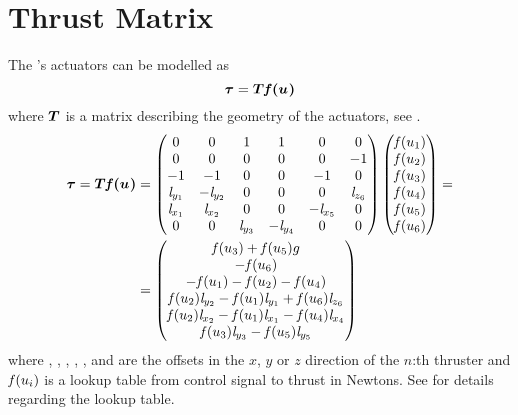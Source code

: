 \section{Thrust Matrix}
The \abbrROV's actuators can be modelled as
\begin{equation}
    \boldsymbol{\tau} = \boldsymbol{T} \boldsymbol{\mathit{f}(u_{})} 
\end{equation}
where $\boldsymbol{T}$ is a matrix describing the geometry of the actuators, see  \citep[p.401]{fossen2011}.
\begin{equation}
\begin{split}
    \boldsymbol{\tau} = \boldsymbol{T} \boldsymbol{\mathit{f}(u_{})} 
    &=
    \begin{pmatrix}
    0& 0& 1& 1& 0& 0\\
    0& 0& 0&  0& 0& -1\\
    -1& -1& 0& 0& -1& 0\\
    \mathit{l}_{y_{1}} & -\mathit{l}_{y_{2}} & 0 &  0 &  0 & \mathit{l}_{z_{6}} \\
    \mathit{l}_{x_{1}} & \mathit{l}_{x_{2}} & 0 & 0 & -\mathit{l}_{x_{5}} & 0 \\
    0 & 0 & \mathit{l}_{y_{3}} & -\mathit{l}_{y_{4}} & 0 & 0 \\
    \end{pmatrix}
    \begin{pmatrix}
    \mathit{f}(u_{1}) \\
    \mathit{f}(u_{2}) \\
    \mathit{f}(u_{3}) \\
    \mathit{f}(u_{4}) \\
    \mathit{f}(u_{5}) \\
    \mathit{f}(u_{6}) \\
    \end{pmatrix}
    = \\
    &=\begin{pmatrix}
     \mathit{f}(u_{3}) + \mathit{f}(u_{5}) g \\
     -\mathit{f}(u_{6}) \\
     -\mathit{f}(u_{1}) - \mathit{f}(u_{2}) - \mathit{f}(u_{4}) \\
    \mathit{f}(u_{2}) \mathit{l}_{y_{2}} - \mathit{f}(u_{1}) \mathit{l}_{y_{1}} + \mathit{f}(u_{6}) \mathit{l}_{z_{6}} \\
    \mathit{f}(u_{2}) \mathit{l}_{x_{2}} - \mathit{f}(u_{1}) \mathit{l}_{x_{1}} - \mathit{f}(u_{4}) \mathit{l}_{x_{4}} \\
    \mathit{f}(u_{3}) \mathit{l}_{y_{3}} - \mathit{f}(u_{5}) \mathit{l}_{y_{5}} \\
    \end{pmatrix}
\end{split}
\end{equation}
where , , , , ,  and  are the offsets in the $x$, $y$ or $z$ direction of the $n$:th thruster and $\mathit{f}(u_{i})$ is a lookup table from control signal to thrust in Newtons. See  for details regarding the lookup table.
